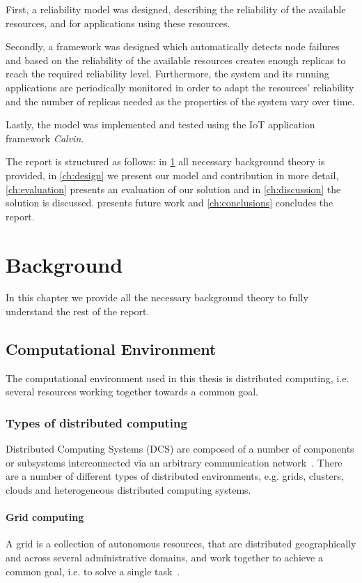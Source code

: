 \documentclass{cslthse-msc}
\begin{document}
First, a reliability model was designed, describing the reliability of the available resources, and for applications using these resources.

Secondly, a framework was designed which automatically detects node failures and based on the reliability of the available resources creates enough replicas to reach the required reliability level. Furthermore, the system and its running applications are periodically monitored in order to adapt the resources' reliability and the number of replicas needed as the properties of the system vary over time.

Lastly, the model was implemented and tested using the IoT application framework \emph{Calvin}.

The report is structured as follows: in \cref{ch:background} all necessary background theory is provided, in \cref{ch:design} we present our model and contribution in more detail, \cref{ch:evaluation} presents an evaluation of our solution and in \cref{ch:discussion} the solution is discussed.  presents future work and \cref{ch:conclusions} concludes the report.

\chapter{Background} \label{ch:background}
In this chapter we provide all the necessary background theory to fully understand the rest of the report.
\section{Computational Environment} \label{sec:background_comp_env}
The computational environment used in this thesis is distributed computing, i.e. several resources working together towards a common goal.

\subsection{Types of distributed computing} \label{subsec:background_types_of_distr_comp}
Distributed Computing Systems (DCS) are composed of a number of components or subsystems interconnected via an arbitrary communication network~\cite{relModelDistSimSystem, efficientRelAnalysisAlgo}. There are a number of different types of distributed environments, e.g. grids, clusters, clouds and heterogeneous distributed computing systems.

\subsubsection{Grid computing}
A grid is a collection of autonomous resources, that are distributed geographically and across several administrative domains, and work together to achieve a common goal, i.e. to solve a single task~\cite{compStudyLoadAndCloud, relAndPerfGridServices, evalOfGridRel}.
\end{document}
